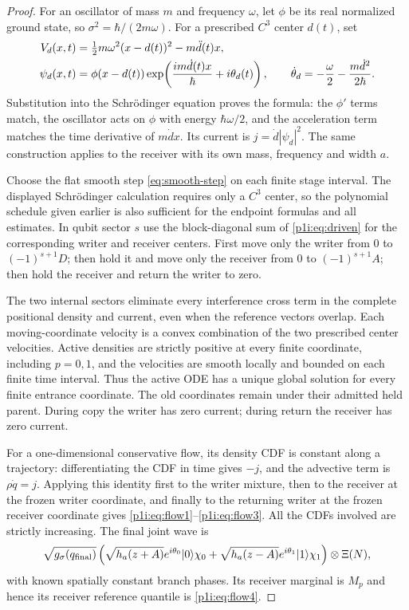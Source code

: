 \documentclass[11pt]{article}
\numberwithin{equation}{section}
\theoremstyle{definition}
\theoremstyle{remark}
\begin{document}
\begin{proof}
For an oscillator of mass $m$ and frequency $\omega$, let $\phi$ be its real
normalized ground state, so $\sigma^2=\hbar/(2m\omega)$. For a prescribed
$C^3$ center $d(t)$, set
\begin{align}
 V_d(x,t)&=\tfrac12m\omega^2(x-d(t))^2-m\ddot d(t)x,\notag\\
 \psi_d(x,t)&=\phi(x-d(t))
  \exp\!\left(\frac{i m\dot d(t)x}{\hbar}+i\theta_d(t)\right),
 \qquad
 \dot\theta_d=-\frac{\omega}{2}-\frac{m\dot d^2}{2\hbar}.
 \label{p1i:eq:driven}
\end{align}
Substitution into the Schr\"odinger equation proves the formula: the
$\phi'$ terms match, the oscillator acts on $\phi$ with energy
$\hbar\omega/2$, and the acceleration term matches the time derivative
of $m\dot d x$. Its current is $j=\dot d|\psi_d|^2$.
The same construction applies to the receiver with its own mass,
frequency and width $a$.

Choose the flat smooth step \eqref{eq:smooth-step} on each finite stage
interval. The displayed Schr\"odinger calculation requires only a $C^3$
center, so the polynomial schedule given earlier is also sufficient for
the endpoint formulas and all estimates. In qubit sector $s$ use
the block-diagonal sum of \eqref{p1i:eq:driven} for the corresponding writer
and receiver centers. First move only the writer from $0$ to $(-1)^{s+1}D$;
then hold it and move only the receiver from $0$ to $(-1)^{s+1}A$;
then hold the receiver and return the writer to zero.

The two internal sectors eliminate every interference cross term in the
complete positional density and current, even when the reference vectors
overlap. Each moving-coordinate velocity is a convex combination of the
two prescribed center velocities. Active densities are strictly positive
at every finite coordinate, including $p=0,1$, and the velocities are
smooth locally and bounded on each finite time interval. Thus the active
ODE has a unique global solution for every finite entrance coordinate.
The old coordinates remain under their admitted held parent. During copy
the writer has zero current; during return the receiver has zero current.

For a one-dimensional conservative flow, its density CDF is constant
along a trajectory: differentiating the CDF in time gives $-j$, and the
advective term is $\rho\dot q=j$. Applying this identity first to the
writer mixture, then to the receiver at the frozen writer coordinate,
and finally to the returning writer at the frozen receiver coordinate
gives \eqref{p1i:eq:flow1}--\eqref{p1i:eq:flow3}. All the CDFs involved are
strictly increasing. The final joint wave is
\begin{equation}\label{p1i:eq:finalwave}
 \sqrt{g_\sigma(q_{\rm final})}
 \left(\sqrt{h_a(z+A)}e^{i\theta_0}|0\rangle\chi_0
 +\sqrt{h_a(z-A)}e^{i\theta_1}|1\rangle\chi_1\right)
 \otimes\Xi(N),
\end{equation}
with known spatially constant branch phases. Its receiver marginal is
$M_p$ and hence its receiver reference quantile is \eqref{p1i:eq:flow4}.


\end{proof}
\end{document}
